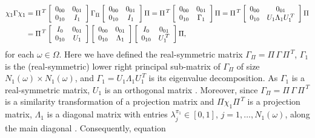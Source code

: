 \documentclass{cmslatex}
\begin{document}
\begin{align}\label{eq:Spec_Decomp_chi_Gamma_chi_Proof}
  \chi_1\Gamma\chi_1&=
  \Pi^{\,T}
  \left[
  \begin{array}{ccc}
    0_{00}&0_{01}\\
    0_{10}&I_1   
    \end{array}
\right]
\Gamma_\Pi
\left[
  \begin{array}{ccc}
    0_{00}&0_{01}\\
    0_{10}&I_1   
    \end{array}
\right]
\Pi
=
\Pi^{\,T}
\left[
  \begin{array}{ccc}
    0_{00}&0_{01}\\
    0_{10}&\Gamma_1   
    \end{array}
\right]
\Pi
=
\Pi^{\,T}
\left[
  \begin{array}{ccc}
    0_{00}&0_{01}\\
    0_{10}&U_1\Lambda_1U_1^{\,T} 
    \end{array}
\right]
\Pi
\notag\\
&=
\Pi^{\,T}
\left[
  \begin{array}{ccc}
    I_0&0_{01}\\
    0_{10}&U_1 
    \end{array}
\right]    
\left[
  \begin{array}{ccc}
    0_{00}&0_{01}\\
    0_{10}&\Lambda_1
    \end{array}
\right]    
\left[
  \begin{array}{ccc}
    I_0&0_{01}\\
    0_{10}&U_1^{\,T} 
    \end{array}
\right]    
\Pi,
\end{align}
%
for each $\omega\in\Omega$. Here we have defined the real-symmetric matrix
$\Gamma_\Pi=\Pi\,\Gamma\,\Pi^{\,T}$, $\Gamma_1$ is the (real-symmetric) lower right 
principal sub-matrix of $\Gamma_\Pi$ of size $N_1(\omega)\times N_1(\omega)$, and 
$\Gamma_1=U_1\Lambda_1U_1^{\,T}$ is its eigenvalue decomposition. As $\Gamma_1$ is a
real-symmetric matrix, $U_1$ is an orthogonal matrix
\cite{Horn_Johnson-1990}. Moreover, since 
$\Gamma_\Pi=\Pi\,\Gamma\,\Pi^{\,T}$ is a similarity transformation of a projection matrix
and $\Pi\chi_1\Pi^{\,T}$ is a projection matrix, $\Lambda_1$ is a diagonal matrix
with entries $\lambda_j^{\pi_1}\in[0,1]$, $j=1,\ldots,N_1 (\omega)$, along the main diagonal
\cite{Horn_Johnson-1990,Demmel:1997}. Consequently, equation
\end{document}
